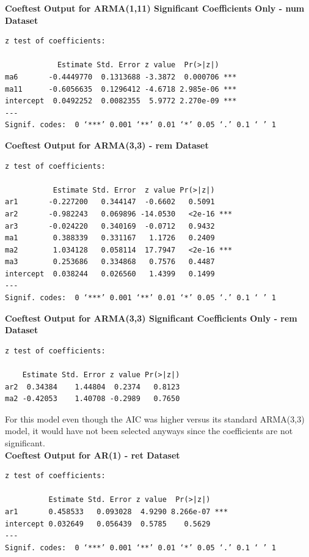 \documentclass[a4paper]{article}
\begin{document}
\textbf{Coeftest Output for ARMA(1,11) Significant Coefficients Only - num Dataset}

\begin{verbatim}
z test of coefficients:

            Estimate Std. Error z value  Pr(>|z|)    
ma6       -0.4449770  0.1313688 -3.3872  0.000706 ***
ma11      -0.6056635  0.1296412 -4.6718 2.985e-06 ***
intercept  0.0492252  0.0082355  5.9772 2.270e-09 ***
---
Signif. codes:  0 ‘***’ 0.001 ‘**’ 0.01 ‘*’ 0.05 ‘.’ 0.1 ‘ ’ 1
\end{verbatim}

\textbf{Coeftest Output for ARMA(3,3) - rem Dataset}

\begin{verbatim}
z test of coefficients:

           Estimate Std. Error  z value Pr(>|z|)    
ar1       -0.227200   0.344147  -0.6602   0.5091    
ar2       -0.982243   0.069896 -14.0530   <2e-16 ***
ar3       -0.024220   0.340169  -0.0712   0.9432    
ma1        0.388339   0.331167   1.1726   0.2409    
ma2        1.034128   0.058114  17.7947   <2e-16 ***
ma3        0.253686   0.334868   0.7576   0.4487    
intercept  0.038244   0.026560   1.4399   0.1499    
---
Signif. codes:  0 ‘***’ 0.001 ‘**’ 0.01 ‘*’ 0.05 ‘.’ 0.1 ‘ ’ 1
\end{verbatim}

\textbf{Coeftest Output for ARMA(3,3) Significant Coefficients Only - rem Dataset}

\begin{verbatim}
z test of coefficients:

    Estimate Std. Error z value Pr(>|z|)
ar2  0.34384    1.44804  0.2374   0.8123
ma2 -0.42053    1.40708 -0.2989   0.7650
\end{verbatim}

For this model even though the AIC was higher versus its standard ARMA(3,3) model, it would have not been selected anyways since the coefficients are not significant. \\

\textbf{Coeftest Output for AR(1) - ret Dataset}

\begin{verbatim}
z test of coefficients:

          Estimate Std. Error z value  Pr(>|z|)    
ar1       0.458533   0.093028  4.9290 8.266e-07 ***
intercept 0.032649   0.056439  0.5785    0.5629    
---
Signif. codes:  0 ‘***’ 0.001 ‘**’ 0.01 ‘*’ 0.05 ‘.’ 0.1 ‘ ’ 1
\end{verbatim}
\end{document}
